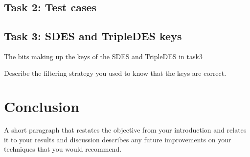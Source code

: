 \documentclass[a4paper,english,12pt]{article}
\begin{document}
\subsection{Task 2: Test cases}
\subsection{Task 3: SDES and TripleDES keys}
The bits making up the keys of the SDES and TripleDES in task3

Describe the filtering strategy you used to know that the keys are correct.

\section{Conclusion}

A short paragraph that restates the objective from your introduction and
relates it to your results and discussion describes any future improvements on
your techniques that you would recommend.



\end{document}
